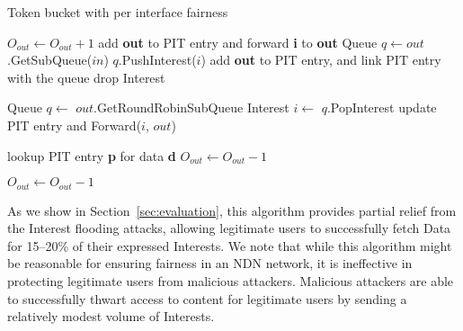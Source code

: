 \begin{algorithm}[h]
\footnotesize
\caption{\small Token bucket with per interface fairness}
\label{alg:queuing}
\begin{algorithmic}[1]
     
\EndFor

\vspace{0.1cm}

     
        \State $O_{out} \leftarrow O_{out} + 1$  
        \State add \textbf{out} to PIT entry and forward \textbf{i} to \textbf{out}
    \Else
        \State Queue $q \leftarrow out$.GetSubQueue($in$)
           \State $q$.PushInterest($i$)
           \State add \textbf{out} to PIT entry, and link PIT entry with the queue
        \Else
           \State drop Interest
        \EndIf
    \EndIf
\EndFunction

\vspace{0.1cm}

\State{} 
    \State Queue $q \leftarrow$ $out$.GetRoundRobinSubQueue 
    \State Interest $i \leftarrow$ $q$.PopInterest
    \State update PIT entry and Forward($i$, $out$)
\EndFunction

\vspace{0.1cm}

   \State lookup PIT entry \textbf{p} for data \textbf{d}
        \State $O_{out} \leftarrow O_{out} - 1$ 
   \EndFor
\EndFunction

\vspace{0.1cm}

        \State $O_{out} \leftarrow O_{out} - 1$ 
   \EndFor
\EndFunction


\end{algorithmic}
\end{algorithm}


As we show in Section~\ref{sec:evaluation}, this algorithm provides partial relief from the Interest flooding attacks, allowing legitimate users to successfully fetch Data for 15--20\% of their expressed Interests. 
We note that while this algorithm might be reasonable for ensuring fairness in an NDN network, it is ineffective in protecting legitimate users from malicious attackers. 
Malicious attackers are able to successfully thwart access to content for legitimate users by sending a relatively modest volume of Interests.


